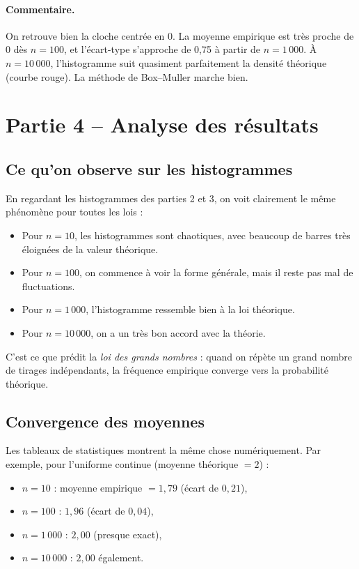 \documentclass[11pt,a4paper]{article}
\begin{document}
\paragraph{Commentaire.} On retrouve bien la cloche centr\'ee en 0. La moyenne
empirique est tr\`es proche de 0 d\`es $n = 100$, et l'\'ecart-type s'approche
de 0,75 \`a partir de $n = 1\,000$. \`A $n = 10\,000$, l'histogramme suit
quasiment parfaitement la densit\'e th\'eorique (courbe rouge). La m\'ethode
de Box--Muller marche bien.

\section{Partie 4 -- Analyse des r\'esultats}
\label{sec:analyse}

\subsection{Ce qu'on observe sur les histogrammes}

En regardant les histogrammes des parties 2 et 3, on voit clairement le m\^eme
ph\'enom\`ene pour toutes les lois :
\begin{itemize}
    \item Pour $n = 10$, les histogrammes sont chaotiques, avec beaucoup
          de barres tr\`es \'eloign\'ees de la valeur th\'eorique.
    \item Pour $n = 100$, on commence \`a voir la forme g\'en\'erale, mais il
          reste pas mal de fluctuations.
    \item Pour $n = 1\,000$, l'histogramme ressemble bien \`a la loi
          th\'eorique.
    \item Pour $n = 10\,000$, on a un tr\`es bon accord avec la th\'eorie.
\end{itemize}

C'est ce que pr\'edit la \emph{loi des grands nombres} : quand on r\'ep\`ete un
grand nombre de tirages ind\'ependants, la fr\'equence empirique converge
vers la probabilit\'e th\'eorique.

\subsection{Convergence des moyennes}

Les tableaux de statistiques montrent la m\^eme chose num\'eriquement. Par
exemple, pour l'uniforme continue (moyenne th\'eorique $= 2$) :
\begin{itemize}
    \item $n = 10$ : moyenne empirique $= 1{,}79$ (\'ecart de $0{,}21$),
    \item $n = 100$ : $1{,}96$ (\'ecart de $0{,}04$),
    \item $n = 1\,000$ : $2{,}00$ (presque exact),
    \item $n = 10\,000$ : $2{,}00$ \'egalement.
\end{itemize}
\end{document}
